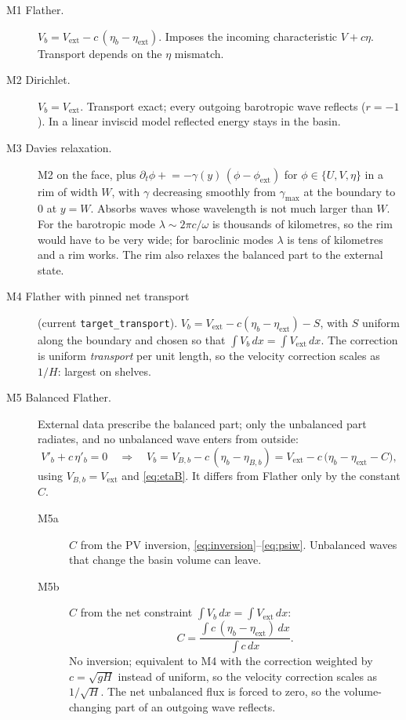 \documentclass[11pt]{article}
\newcommand{\ext}{\mathrm{ext}}
\begin{document}
\begin{description}
  \item[M1 Flather.] $V_b = V_\ext - c\,(\eta_b - \eta_\ext)$.
        Imposes the incoming characteristic $V+c\eta$. Transport depends on the $\eta$ mismatch.

  \item[M2 Dirichlet.] $V_b = V_\ext$.
        Transport exact; every outgoing barotropic wave reflects ($r=-1$). In a linear inviscid model reflected
        energy stays in the basin.

  \item[M3 Davies relaxation.] M2 on the face, plus $\partial_t\phi \mathrel{+}= -\gamma(y)\,(\phi-\phi_\ext)$ for
        $\phi\in\{U,V,\eta\}$ in a rim of width $W$, with $\gamma$ decreasing smoothly from $\gamma_{\max}$ at the
        boundary to $0$ at $y=W$. Absorbs waves whose wavelength is not much larger than $W$. For the barotropic
        mode $\lambda\sim 2\pi c/\omega$ is thousands of kilometres, so the rim would have to be very wide; for
        baroclinic modes $\lambda$ is tens of kilometres and a rim works. The rim also relaxes the balanced part to
        the external state.

  \item[M4 Flather with pinned net transport] (current \texttt{target\_transport}).
        $V_b = V_\ext - c(\eta_b-\eta_\ext) - S$, with $S$ uniform along the boundary and chosen so that
        $\int V_b\,dx = \int V_\ext\,dx$. The correction is uniform \emph{transport} per unit length, so the
        velocity correction scales as $1/H$: largest on shelves.

  \item[M5 Balanced Flather.] External data prescribe the balanced part; only the unbalanced part radiates, and
        no unbalanced wave enters from outside:
        \begin{equation}
          V'_b + c\,\eta'_b = 0
          \quad\Longrightarrow\quad
          V_b = V_{B,b} - c\,(\eta_b - \eta_{B,b}) = V_\ext - c\,\bigl(\eta_b - \eta_\ext - C\bigr),
          \label{eq:m5}
        \end{equation}
        using $V_{B,b}=V_\ext$ and \eqref{eq:etaB}. It differs from Flather only by the constant $C$.
        \begin{description}
          \item[M5a] $C$ from the PV inversion, \eqref{eq:inversion}--\eqref{eq:psiw}. Unbalanced waves that change
                the basin volume can leave.
          \item[M5b] $C$ from the net constraint $\int V_b\,dx = \int V_\ext\,dx$:
                \begin{equation}
                  C = \frac{\int c\,(\eta_b-\eta_\ext)\,dx}{\int c\,dx}.
                \end{equation}
                No inversion; equivalent to M4 with the correction weighted by $c=\sqrt{gH}$ instead of uniform,
                so the velocity correction scales as $1/\sqrt{H}$. The net unbalanced flux is forced to zero, so the
                volume-changing part of an outgoing wave reflects.
        \end{description}
\end{description}
\end{document}
